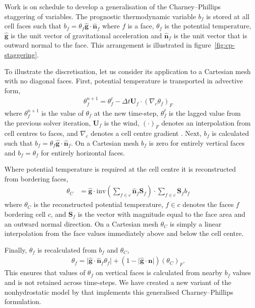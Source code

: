 \documentclass[a4paper,11pt]{article}
\begin{document}
Work is on schedule to develop a generalisation of the Charney--Phillips staggering of variables.  The prognostic thermodynamic variable $b_f$ is stored at all cell faces such that $b_f = \theta_f \mathbf{\hat{g}} \cdot \mathbf{\hat{n}}_f$ where $f$ is a face, $\theta_f$ is the potential temperature, $\mathbf{\hat{g}}$ is the unit vector of gravitational acceleration and $\mathbf{\hat{n}}_f$ is the unit vector that is outward normal to the face.
This arrangement is illustrated in figure~\ref{fig:cp-staggering}.

To illustrate the discretisation, let us consider its application to a Cartesian mesh with no diagonal faces.  First, potential temperature is transported in advective form,
\begin{align}
	\theta_f^{n+1} = \theta_f^{\ell} - \Delta t \mathbf{U}_f \cdot \left( \nabla_c \theta_f \right)_F
\end{align}
where $\theta_f^{n+1}$ is the value of $\theta_f$ at the new time-step, $\theta_f^\ell$ is the lagged value from the previous solver iteration, $\mathbf{U}_f$ is the wind, $\left( \cdot \right)_F$ denotes an interpolation from cell centres to faces, and $\nabla_c$ denotes a cell centre gradient \citep{weller-shahrokhi2014}.
Next, $b_f$ is calculated such that $b_f = \theta_f \mathbf{\hat{g}} \cdot \mathbf{\hat{n}}_f$.  
On a Cartesian mesh $b_f$ is zero for entirely vertical faces and $b_f = \theta_f$ for entirely horizontal faces.

Where potential temperature is required at the cell centre it is reconstructed from bordering faces,
\begin{align}
	\theta_C &= \mathbf{\hat{g}} \cdot \mathrm{inv} \left( \sum_{f \in c} \mathbf{\hat{n}}_f \mathbf{S}_f \right) \cdot \sum_{f \in c} \mathbf{S}_f b_f \label{eqn:reconstruct}
\end{align}
where $\theta_C$ is the reconstructed potential temperature, $f \in c$ denotes the faces $f$ bordering cell $c$, and $\mathbf{S}_f$ is the vector with magnitude equal to the face area and an outward normal direction.  On a Cartesian mesh $\theta_C$ is simply a linear interpolation from the face values immediately above and below the cell centre.

Finally, $\theta_f$ is recalculated from $b_f$ and $\theta_C$,
\begin{align}
	\theta_f = \lvert \mathbf{\hat{g}} \cdot \mathbf{\hat{n}}_f \theta_f \rvert + \left( 1 - \lvert \mathbf{\hat{g}} \cdot \mathbf{\hat{n}} \rvert \right) \left( \theta_C \right)_F \text{.}
\end{align}
This ensures that values of $\theta_f$ on vertical faces is calculated from nearby $b_f$ values and is not retained across time-steps.
We have created a new variant of the nonhydrostatic model by \citet{weller-shahrokhi2014} that implements this generalised Charney--Phillips formulation.
\end{document}
